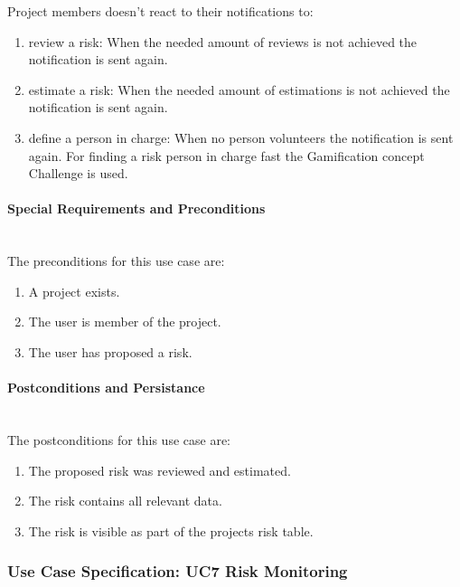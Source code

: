 \noindent
Project members doesn't react to their notifications to:
\begin{enumerate}
	\vspace{-3mm}
	\setlength\itemsep{-1em}
	
	\item review a risk: When the needed amount of reviews is not achieved the notification is sent again.
	\item estimate a risk: When the needed amount of estimations is not achieved the notification is sent again.
	\item define a person in charge: When no person volunteers the notification is sent again. For finding a risk person in charge fast the Gamification concept Challenge is used.
\end{enumerate}

\paragraph*{Special Requirements and Preconditions}\mbox{}\\
The preconditions for this use case are:
\begin{enumerate}
	\vspace{-3mm}
	\setlength\itemsep{-1em}
	
	\item  A project exists.
	\item The user is member of the project.
	\item The user has proposed a risk.
\end{enumerate}

\paragraph*{Postconditions and Persistance}\mbox{}\\
The postconditions for this use case are:
\begin{enumerate}
	\vspace{-3mm}
	\setlength\itemsep{-1em}
	
	\item The proposed risk was reviewed and estimated. 
	\item The risk contains all relevant data.
	\item The risk is visible as part of the projects risk table.
\end{enumerate}

\newpage
\subsubsection{Use Case Specification: \ac{UC}7 Risk Monitoring}
\label{sec:domainBbh}

